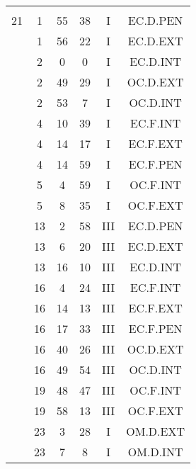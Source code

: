 \documentclass[12pt, a4paper]{article}
\begin{document}
\begin{multicols}{3}
{\begin{tabular}{c c c c c c}
	 	 	 	 & & & & & \\%
	 	 	 	21 & 1 & 55 & 38 & I & EC.D.PEN\\%
	 	 	 	 & 1 & 56 & 22 & I & EC.D.EXT\\%
	 	 	 	 & 2 & 0 & 0 & I & EC.D.INT\\%
	 	 	 	 & 2 & 49 & 29 & I & OC.D.EXT\\%
	 	 	 	 & 2 & 53 & 7 & I & OC.D.INT\\%
	 	 	 	 & 4 & 10 & 39 & I & EC.F.INT\\%
	 	 	 	 & 4 & 14 & 17 & I & EC.F.EXT\\%
	 	 	 	 & 4 & 14 & 59 & I & EC.F.PEN\\%
	 	 	 	 & 5 & 4 & 59 & I & OC.F.INT\\%
	 	 	 	 & 5 & 8 & 35 & I & OC.F.EXT\\%
	 	 	 	 & 13 & 2 & 58 & III & EC.D.PEN\\%
	 	 	 	 & 13 & 6 & 20 & III & EC.D.EXT\\%
	 	 	 	 & 13 & 16 & 10 & III & EC.D.INT\\%
	 	 	 	 & 16 & 4 & 24 & III & EC.F.INT\\%
	 	 	 	 & 16 & 14 & 13 & III & EC.F.EXT\\%
	 	 	 	 & 16 & 17 & 33 & III & EC.F.PEN\\%
	 	 	 	 & 16 & 40 & 26 & III & OC.D.EXT\\%
	 	 	 	 & 16 & 49 & 54 & III & OC.D.INT\\%
	 	 	 	 & 19 & 48 & 47 & III & OC.F.INT\\%
	 	 	 	 & 19 & 58 & 13 & III & OC.F.EXT\\%
	 	 	 	 & 23 & 3 & 28 & I & OM.D.EXT\\%
	 	 	 	 & 23 & 7 & 8 & I & OM.D.INT\\%

\end{tabular}}
\end{multicols}
\end{document}
